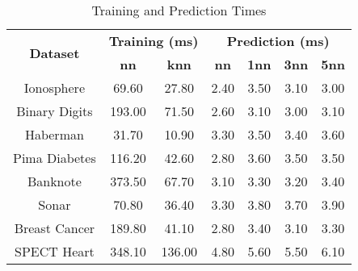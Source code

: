 \begin{table}[htbp]
\caption{Training and Prediction Times}
\begin{center}
\begin{tabular}{|c|c|c|c|c|c|c|}
\hline
\multirow{2}{*}{\textbf{Dataset}} & \multicolumn{2}{c|}{\textbf{Training (ms)}} & \multicolumn{4}{c|}{\textbf{Prediction (ms)}} \\ \cline{2-7}
 & \textbf{nn} & \textbf{knn} & \textbf{nn} & \textbf{1nn} & \textbf{3nn} & \textbf{5nn} \\ \hline
Ionosphere & 69.60 & 27.80 & 2.40 & 3.50 & 3.10 & 3.00 \\ \hline
Binary Digits & 193.00 & 71.50 & 2.60 & 3.10 & 3.00 & 3.10 \\ \hline
Haberman & 31.70 & 10.90 & 3.30 & 3.50 & 3.40 & 3.60 \\ \hline
Pima Diabetes & 116.20 & 42.60 & 2.80 & 3.60 & 3.50 & 3.50 \\ \hline
Banknote & 373.50 & 67.70 & 3.10 & 3.30 & 3.20 & 3.40 \\ \hline
Sonar & 70.80 & 36.40 & 3.30 & 3.80 & 3.70 & 3.90 \\ \hline
Breast Cancer & 189.80 & 41.10 & 2.80 & 3.40 & 3.10 & 3.30 \\ \hline
SPECT Heart & 348.10 & 136.00 & 4.80 & 5.60 & 5.50 & 6.10 \\ \hline
\end{tabular}
\label{tab:timing}
\end{center}
\end{table}
